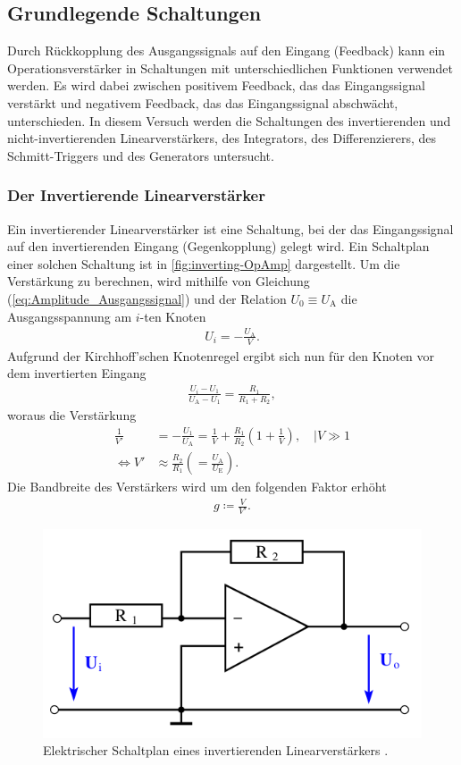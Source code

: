 \subsection{Grundlegende Schaltungen}\label{subsec:Grundlegende Schaltungen}        %
Durch Rückkopplung des Ausgangssignals auf den Eingang (Feedback) kann ein Operationsverstärker in Schaltungen mit unterschiedlichen Funktionen verwendet werden. 
Es wird dabei zwischen positivem Feedback, das das Eingangssignal verstärkt und negativem Feedback, das das Eingangssignal abschwächt, unterschieden.
In diesem Versuch werden die Schaltungen des invertierenden und nicht-invertierenden Linearverstärkers, des Integrators, des Differenzierers, des Schmitt-Triggers und des Generators untersucht.

\subsubsection{Der Invertierende Linearverstärker}\label{subsubsec:Invertierender Linearverstärker}
Ein invertierender Linearverstärker ist eine Schaltung, bei der das Eingangssignal auf den invertierenden Eingang (Gegenkopplung) gelegt wird.
Ein Schaltplan einer solchen Schaltung ist in \autoref{fig:inverting-OpAmp} dargestellt.
Um die Verstärkung zu berechnen, wird mithilfe von Gleichung (\ref{eq:Amplitude_Ausgangssignal}) und der Relation $U_0\equiv U_\text{A}$ die Ausgangsspannung am $i$-ten Knoten
\begin{align}
    U_i=-\frac{U_\text{A}}{V}.
\end{align}
Aufgrund der Kirchhoff'schen Knotenregel ergibt sich nun für den Knoten vor dem invertierten Eingang
\begin{align}
    \frac{U_i-U_1}{U_\text{A}-U_1} = \frac{R_1}{R_1+R_2},
\end{align}
woraus die Verstärkung
\begin{align}
    \frac1{V'}&=-\frac{U_1}{U_\text{A}}=\frac{1}{V}+\frac{R_1}{R_2}\left(1+\frac{1}{V}\right),\quad |V\gg 1 \\
    \iff V' &\approx\frac{R_2}{R_1}\left(=\frac{U_\text{A}}{U_\text{E}}\right).
\end{align}
Die Bandbreite des Verstärkers wird um den folgenden Faktor erhöht
\begin{align}
    g\coloneqq\frac{V}{V'}.
\end{align}
\begin{figure}[H]
	\centering
    \includegraphics[width=0.6\linewidth]{figures/inverting-OpAmp.png}
	\caption{Elektrischer Schaltplan eines invertierenden Linearverstärkers \cite{Anleitung51}.}
	\label{fig:inverting-OpAmp}
\end{figure}

